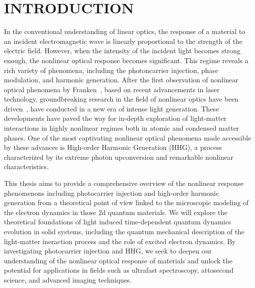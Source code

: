 

\chapter{INTRODUCTION }
\label{ch:introduction}
In the conventional understanding of linear optics, the response of a material to an incident
electromagnetic wave is linearly proportional to the strength of the electric field. However, when
the intensity of the incident light becomes strong enough, the nonlinear optical response
becomes significant. This regime reveals a rich variety of phenomena, including the photoncarrier
injection, phase modulation, and harmonic generation.
After the first observation of nonlinear optical phenomena by Franken~\cite{franken1961generation},
based on recent advancements in laser technology, groundbreaking research in the field of nonlinear
optics have been driven~\cite{RevModPhys.72.545, RevModPhys.81.163, MOUROU2012720}, have conducted in a new era of intense light generation. These developments have paved the way for in-depth exploration of light-matter interactions in highly nonlinear regimes both in atomic and condensed matter phases. One of the most captivating nonlinear optical phenomena made accessible by these advances is High-order Harmonic Generation (\gls{HHG}), a process characterized by its extreme photon upconversion and remarkable nonlinear characteristics.

This thesis aims to provide a comprehensive overview of the nonlinear response phenomenons
including photocarrier injection and high-order harmonic generation from a theoretical point of view linked to the microscopic modeling of the electron dynamics in those 2d quantum materials. We will explore the theoretical foundations of light induced time-dependent quantum
dynamics evolution in solid systems,
including the quantum mechanical description of the light-matter ineraction process and the role of
excited electron dynamics.  By investigating photocarrier injection and HHG, we seek to deepen our understanding of the nonlinear optical response of materials and unlock the potential for applications in fields such as ultrafast spectroscopy, attosecond science, and advanced imaging techniques.
